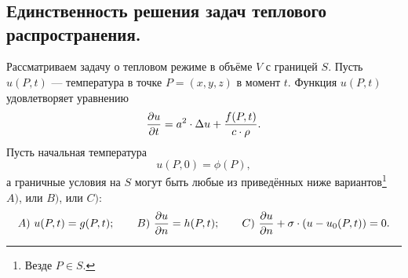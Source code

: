 \chapter{}
\label{lecture19}
\section{Единственность решения задач теплового распространения.}
\label{lecture19section1}
Рассматриваем задачу о тепловом режиме в объёме $V$ с границей $S$. Пусть $u(P,t)$ --- температура в точке $P=(x,y,z)$ в момент $t$. Функция $u(P,t)$ удовлетворяет уравнению
\begin{equation}\label{l19:eq:1}
	 \frac{\partial u}{\partial t}=a^2\cdot\Delta u+\frac{f(P,t)}{c\cdot\rho}. 
\end{equation}
Пусть начальная температура 
\begin{equation}\label{l19:eq:2}
	 u(P,0)=\phi(P),
\end{equation}
а граничные условия на $S$ могут быть любые из приведённых ниже вариантов\footnote[1]{Везде $P\in S$.} $A)$, или $B)$, или $C)$:
\begin{equation}\label{l19:eq:3}
	 A)\ u(P,t)=g(P,t);\qquad B)\ \pder{u}{n}=h(P,t);\qquad C)\ \pder{u}{n}+\sigma\cdot(u-u_0(P,t))=0.
\end{equation}  
